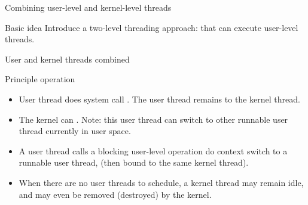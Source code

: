   \begin{slide}{Combining user-level and kernel-level threads}
    \begin{block}{Basic idea} 
      Introduce a two-level threading approach:  that can execute user-level
      threads.
    \end{block}
    \begin{block}{}
      \begin{center}
      \end{center}
    \end{block}
  \end{slide}
  \begin{slide}{User and kernel threads combined}
    \begin{block}{Principle operation}
      \begin{itemize}%
      \item<2-> User thread does system call \mathexpr{\Rightarrow} . The user thread remains  to the kernel thread.
      \item<3-> The kernel can . Note: this user thread can switch to  other runnable user thread currently in user
        space.
      \item<4-> A user thread calls a blocking user-level operation \mathexpr{\Rightarrow} do context switch
        to a runnable user thread, (then bound to the same kernel thread).
      \item<5-> When there are no user threads to schedule, a kernel thread may remain idle, and may even be
        removed (destroyed) by the kernel.
      \end{itemize}
    \end{block}
  \end{slide}

